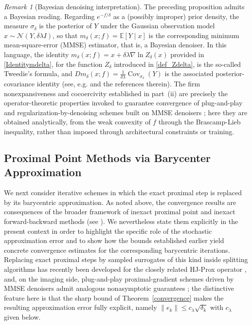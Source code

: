 \documentclass[11pt]{article}
\newcommand{\1}{\mathds{1}}
\theoremstyle{definition}
\theoremstyle{remark}
\newtheorem{remark}[theorem]{Remark}
\theoremstyle{definition}
\begin{document}
\begin{remark}[Bayesian denoising interpretation]
The preceding proposition admits a Bayesian reading. Regarding
$e^{-f/\delta}$ as a (possibly improper) prior density, the measure
$\sigma_\delta$ is the posterior of $Y$ under the Gaussian observation
model $x\sim\mathcal{N}(Y,\delta\lambda I)$, so that
$m_\delta(x;f)=\mathbb{E}[Y\mid x]$ is the corresponding minimum
mean-square-error (MMSE) estimator, that is, a Bayesian denoiser. In this
language, the identity $m_\delta(x;f)=x+\delta\lambda\nabla\ln Z_\delta(x)$ provided in \eqref{Identitymdelta}, for the function $Z_\delta$ introduced in \eqref{def_Zdelta},  is  the so-called Tweedie's formula, and
$Dm_\delta(x;f)=\frac{1}{\delta\lambda}\operatorname{Cov}_{\sigma_\delta}(Y)$
is the associated posterior-covariance identity (see, e.g. \cite{Efron2011} and the references therein). The
firm nonexpansiveness and cocoercivity established in part~(ii) are
precisely the operator-theoretic properties invoked to guarantee
convergence of plug-and-play and regularization-by-denoising schemes built
on MMSE denoisers \cite{XuSunLiuWohlbergKamilov2020,PritchardParhi2025};
here they are obtained analytically, from the weak convexity of $f$ through
the Brascamp-Lieb inequality, rather than imposed through architectural
constraints or training.
\end{remark}



\subsection{Proximal Point Methods via Barycenter Approximation}

We next consider iterative schemes in which the exact proximal step is replaced by its barycentric approximation. As noted above, the convergence results are consequences of the broader framework of inexact proximal point and inexact forward-backward methods (see \cite{MR3942891}). We nevertheless state them explicitly in the present context in order to highlight the specific role of the stochastic approximation error and to show how the bounds established earlier yield concrete convergence estimates for the corresponding barycentric iterations. Replacing exact proximal steps by sampled surrogates of this kind inside splitting algorithms has recently been developed for the closely related HJ-Prox operator \cite{DiChiWuFung2026}, and, on the imaging side, plug-and-play proximal-gradient schemes driven by MMSE denoisers admit analogous nonasymptotic guarantees \cite{PritchardParhi2025}; the distinctive feature here is that the sharp bound of Theorem~\ref{convergence} makes the resulting approximation error fully explicit, namely $\|e_k\|\le c_\lambda\sqrt{\delta_k}$ with $c_\lambda$ given below.
\end{document}
